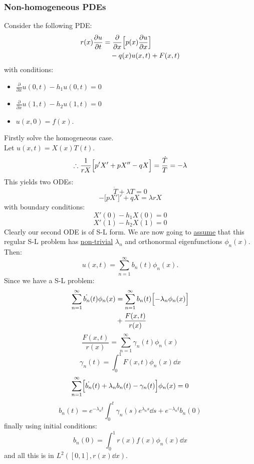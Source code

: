 \documentclass{article}
\begin{document}
\begin{multicols}{3}
\subsubsection*{Non-homogeneous PDEs}
Consider the following PDE:
\begin{align*}
    r(x)\frac{\partial u}{\partial t}
    &=\frac{\partial}{\partial x}\Bigl[
    p(x)\frac{\partial u}{\partial x}
    \Bigr] \\
    &\quad-q(x)u(x,t)+F(x,t)
\end{align*}
with conditions:
\begin{itemize}
    \item $\displaystyle\frac{\partial}{\partial x}
    u(0,t)-h_1 u(0,t)=0$
    \item $\displaystyle\frac{\partial}{\partial x}
    u(1,t)-h_2 u(1,t)=0$
    \item $u(x,0)=f(x)$.
\end{itemize}
Firstly solve the homogeneous
case. \\ 
Let $u(x,t)=X(x)T(t)$.
$$\therefore\frac{1}{rX}\Bigl[p'X'+pX''
-qX\Bigr]=\frac{\dot{T}}{T}=-\lambda$$
This yields two ODEs:
$$\dot{T}+\lambda T=0$$
$$-\bigl[pX'\bigr]'+qX=\lambda rX$$
with boundary conditions:
$$X'(0)-h_1 X(0)=0$$
$$X'(1)-h_2 X(1)=0$$
Clearly our second ODE is of S-L form.
We are now going to \underline{assume} that this
regular S-L problem has \underline{non-trivial} $\lambda_n$
and orthonormal eigenfunctions $\phi_n(x)$. Then:
$$u(x,t)=\sum_{n=1}^{\infty}b_n(t)\phi_n(x).$$
Since we have a S-L problem:
\begin{align*} 
    \sum_{n=1}^{\infty}\dot{b_n}(t)\phi_n(x)
    &=\sum_{n=1}^{\infty}b_n(t)\Bigl[-\lambda_n\phi_n(x)\Bigr] \\
    &+\frac{F(x,t)}{r(x)}
\end{align*}
$$\frac{F(x,t)}{r(x)}=\sum_{n=1}^{\infty}\gamma_n(t)\phi_n(x)$$
$$\gamma_n(t)=\int_{0}^{1}F(x,t)\phi_n(x)\dd x$$
$$\sum_{n=1}^{\infty}\Bigl[\dot{b_n}(t)
+\lambda_n b_n(t)-\gamma_n(t)\Bigr]\phi_n(x)=0$$
$$b_n(t)=e^{-\lambda_n t}
\int_{0}^{t}\gamma_n(s)e^{\lambda_n s}\dd s
+e^{-\lambda_n t}b_n(0)$$
finally using initial conditions:
$$b_n(0)=\int_{0}^{1}r(x)f(x)\phi_n(x)\dd x$$
and all this is in $L^2([0,1],r(x)\dd x)$.


\end{multicols}
\end{document}

